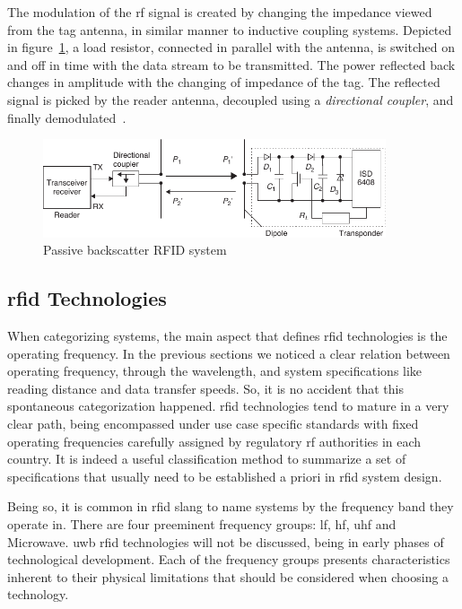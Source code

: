 The modulation of the \ac{rf} signal is created by changing the impedance viewed from the tag antenna, in similar manner to inductive coupling systems. 
Depicted in figure~\ref{fig:backscatter}, a load resistor, connected in parallel with the antenna, is switched on and off in time with the data stream to be transmitted.
The power reflected back changes in amplitude with the changing of impedance of the tag.
The reflected signal is picked by the reader antenna, decoupled using a \emph{directional coupler}, and finally demodulated~\cite{finkenzellerRFIDHandbookFundamentals2003, RFIDCouplingTechniques}.

\begin{figure}[!ht]
    \centering
    \includegraphics[width=0.9\textwidth]{./figs/02-state-of-the-art/backscatter.pdf}
    \caption[Passive backscatter RFID system]{Passive backscatter RFID system~\cite{finkenzellerRFIDHandbookFundamentals2003}} 
    \label{fig:backscatter}
\end{figure}

\subsection{\ac{rfid} Technologies} \label{sec:opfrequency}

When categorizing systems, the main aspect that defines \ac{rfid} technologies is the operating frequency.
In the previous sections we noticed a clear relation between operating frequency, through the wavelength, and system specifications like reading distance and data transfer speeds.
So, it is no accident that this spontaneous categorization happened. \ac{rfid} technologies tend to mature in a very clear path, being encompassed under use case specific standards with fixed operating frequencies carefully assigned by regulatory \ac{rf} authorities in each country. 
It is indeed a useful classification method to summarize a set of specifications that usually need to be established a priori in \ac{rfid} system design.

Being so, it is common in \ac{rfid} slang to name systems by the frequency band they operate in.
There are four preeminent frequency groups: \ac{lf}, \ac{hf}, \ac{uhf} and Microwave. \ac{uwb} \ac{rfid} technologies will not be discussed, being in early phases of technological development.
Each of the frequency groups presents characteristics inherent to their physical limitations that should be considered when choosing a technology.

